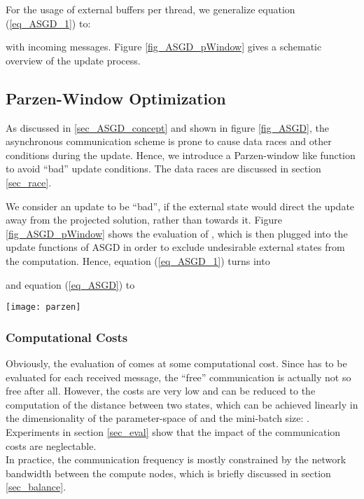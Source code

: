 \documentclass{acm_proc_article-sp}
\begin{document}
For the usage of  external buffers per thread, we generalize equation (\ref{eq_ASGD_1}) to:

with  incoming messages. Figure \ref{fig_ASGD_pWindow} gives a schematic overview 
of the update process.

\subsection{{Parzen-Window} Optimization}
As discussed in \ref{sec_ASGD_concept} 
and shown in figure \ref{fig_ASGD}, the asynchronous communication scheme is prone 
to cause data races and other conditions during the update. Hence, we introduce a 
Parzen-window like function  to avoid ``bad'' update conditions. The data 
races are discussed in section \ref{sec_race}. 

We consider an update to be ``bad'', if the external state  would direct
the update away from the projected solution, rather than towards it. Figure
\ref{fig_ASGD_pWindow} shows the evaluation of ,
which is then plugged into the update functions of ASGD in order to exclude 
undesirable external states from the computation. Hence, equation (\ref{eq_ASGD_1}) 
turns into

and equation (\ref{eq_ASGD}) to


\begin{figure*}
\texttt{[image: parzen]}
\caption{ASGD updating. This figure visualizes the update algorithm 
of a process with state , its local mini-batch update 
 and received external state   for a 
simplified 1-dimensional optimization problem. The dotted lines indicate 
a projection of the expected descent path to an (local) optimum. 
{\bf I:} Initial setting:  is computed and  
is in the external
buffer.
{\bf II:} Parzen-window masking of . Only if the condition of equation 
(\ref{eq_Parzen}) is
met,  will contribute to the local update.
{\bf III:} Computing .
{\bf IV:} Updating .   
\label{fig_ASGD_pWindow}
}
\end{figure*}

\subsubsection*{Computational Costs}
Obviously, the evaluation of  comes at some computational cost.
Since 
has to be evaluated for each received message,
the ``free'' communication is actually not so free after all.
However, the costs are very low and can be reduced  
 to the computation of the distance between two states, which can be
achieved linearly in the dimensionality of the parameter-space of  and the mini-batch size: 
. Experiments in section \ref{sec_eval} show that the impact
of the communication costs are neglectable.\\
In practice, the communication frequency  is mostly constrained by the 
network bandwidth between the compute nodes, which is briefly discussed in section
\ref{sec_balance}.    
\end{document}
